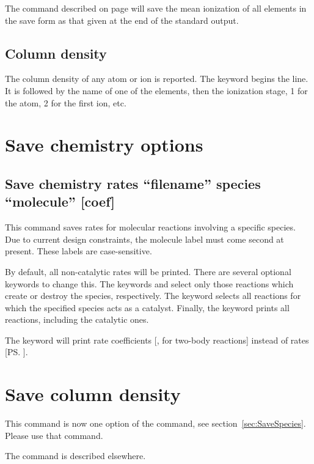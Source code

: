 The  command described on 
page \pageref{sec:CommandSaveIonizationMeans} will save
the mean ionization of all elements in the save form as that given
at the end of the standard output.

\subsection{Column density}

The column density of any atom or ion is reported.
The keyword
 begins the line.
It is followed by the name of one of the
elements, then the ionization stage, 1 for the atom,
2 for the first ion, etc.

\section{Save chemistry options}

\subsection{Save chemistry rates ``filename'' species ``molecule'' [coef]}
\label{s:savechemrate}

This command saves rates for molecular reactions involving a specific
species.  Due to current design constraints, the molecule label must come 
second at present.  These labels are case-sensitive.

By default, all non-catalytic rates will be printed.  
There are several optional keywords to change this.
The keywords  and 
select only those reactions which create or destroy the species, respectively.
The keyword  selects all reactions for which 
the specified species acts as a catalyst. 
Finally, the keyword  prints all reactions, including the catalytic ones.

The keyword  will print rate coefficients [\ccmps, for two-body reactions]
instead of rates [\ps].

\section{Save column density}

This command is now one option of the  command,
see section~\ref{sec:SaveSpecies}.
Please use that command.

The  command is  described elsewhere.

